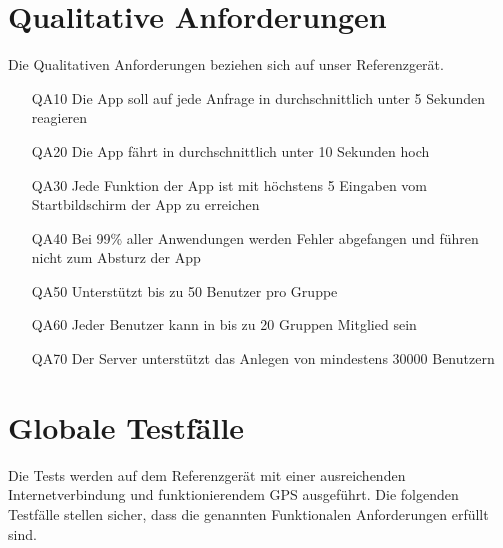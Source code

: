 \documentclass{scrartcl}
\begin{document}
	\newpage
	
	
	\section{Qualitative Anforderungen}
	Die Qualitativen Anforderungen beziehen sich auf unser Referenzgerät.
	\begin{itemize}
		\item[QA10] Die App soll auf jede Anfrage in durchschnittlich unter 5 Sekunden reagieren
		\item[QA20] Die App fährt in durchschnittlich unter 10 Sekunden hoch
		\item[QA30] Jede Funktion der App ist mit höchstens 5 Eingaben vom Startbildschirm der App zu erreichen
		\item[QA40] Bei 99\% aller Anwendungen werden Fehler abgefangen und führen nicht zum Absturz der App
		\item[QA50] Unterstützt bis zu 50 Benutzer pro Gruppe
		\item[QA60] Jeder Benutzer kann in bis zu 20 Gruppen \gls{Mitglied} sein
		\item[QA70] Der \gls{Server} unterstützt das Anlegen von mindestens 30000 Benutzern
	\end{itemize}
	
	\newpage
	
	
	\section{Globale Testfälle}
Die Tests werden auf dem Referenzgerät mit einer ausreichenden Internetverbindung und funktionierendem GPS ausgeführt. \newline
	Die folgenden Testfälle stellen sicher, dass die genannten Funktionalen Anforderungen erfüllt sind.
	
\end{document}
